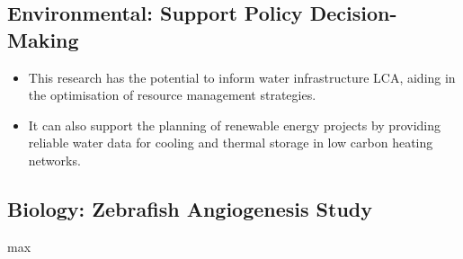 \subsection{Environmental: Support Policy Decision-Making}
\begin{itemize}
    \item This research has the potential to inform water infrastructure LCA, aiding in the optimisation of resource management strategies. 
    \item It can also support the planning of renewable energy projects by providing reliable water data for cooling and thermal storage in low carbon heating networks. 
\end{itemize}
\subsection{Biology: Zebrafish Angiogenesis Study}
max